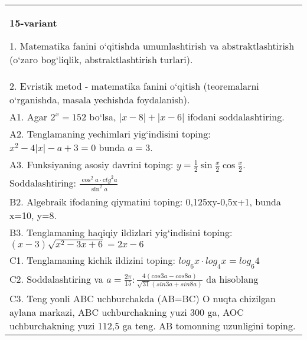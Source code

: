 \documentclass{article}
\begin{document}
\begin{tabular}{m{17cm}}
\textbf{15-variant}

1. Matematika fanini o‘qitishda umumlashtirish va abstraktlashtirish (o‘zaro bog‘liqlik, abstraktlashtirish turlari). \\
2. Evristik metod - matematika fanini o‘qitish (teoremalarni o‘rganishda, masala yechishda foydalanish). \\
A1. Agar \(2^{x} = 152\) bo‘lsa, \(|x - 8| + |x - 6|\) ifodani soddalashtiring. \\
A2. Tenglamaning yechimlari yig‘indisini toping: \(x^2 - 4|x| - a + 3 = 0\) bunda \(a = 3\). \\
A3. Funksiyaning asosiy davrini toping: \(y = \frac{1}{2}\sin{\frac{x}{2}\cos\frac{x}{2}}\). \\
Soddalashtiring: \(\frac{\cos^{2}a \cdot {ctg}^{2}a}{\sin^{2}a}\) \\
B2. Algebraik ifodaning qiymatini toping: 0,125xy-0,5x+1, bunda x=10, y=8. \\
B3. Tenglamaning haqiqiy ildizlari yig‘indisini toping: \((x-3) \sqrt{x^{2} - 3x + 6} = 2x - 6\) \\
C1. Tenglamaning kichik ildizini toping: \(log_{6}x \cdot log_{4}x = log_{6}4\) \\
C2. Soddalashtiring va \(a = \frac{2\pi}{15}:\frac{4 (cos3a - cos8a) }{\sqrt{31} (sin3a + sin8a) }\) da hisoblang \\
C3. Teng yonli ABC uchburchakda (AB=BC) O nuqta chizilgan aylana markazi, ABC uchburchakning yuzi 300 ga, AOC uchburchakning yuzi 112,5 ga teng. AB tomonning uzunligini toping. \\

\end{tabular}
\vspace{1cm}
\end{document}
